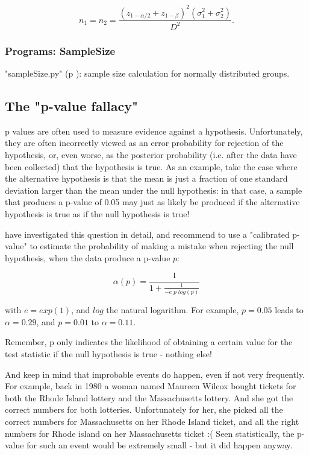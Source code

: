 \begin{equation}
  {n_1} = {n_2} = \frac{{({z_{1 - \alpha /2}} + {z_{1 - \beta }})}^2(\sigma _1^2 + \sigma _2^2)}{D^2} .
\end{equation}

\subsubsection{Programs: SampleSize}

\PyImg "sampleSize.py" (p \pageref{py:sampleSize}): sample size calculation for normally distributed groups.


\subsection{The "p-value fallacy"}

p values are often used to measure evidence against a hypothesis. Unfortunately, they are often incorrectly viewed as an error probability for rejection of the hypothesis, or, even worse, as the posterior probability (i.e. after the data have been collected) that the hypothesis is true. As an example, take the case where the alternative hypothesis is that the mean is just a fraction of one standard deviation larger than the mean under the null hypothesis: in that case, a sample that produces a p-value of 0.05 may just as likely be produced if the alternative hypothesis is true as if the null hypothesis is true!

\cite{sellke2001} have investigated this question in detail, and recommend to use a "calibrated p-value" to estimate the probability of making a mistake when rejecting the null hypothesis, when the data produce a p-value $p$:

\begin{equation}\label{eq:pFallacy}
    \alpha(p)= \frac{1}{1 + \frac{1}{-e \; p \; log(p)}}
\end{equation}

with $e=exp(1)$, and $log$ the natural logarithm. For example, $p=0.05$ leads to $\alpha=0.29$, and $p=0.01$ to $\alpha=0.11$.

Remember, p only indicates the likelihood of obtaining a certain value for the test statistic if the null hypothesis is true - nothing else!

And keep in mind that improbable events do happen, even if not very frequently. For example, back in 1980 a woman named Maureen Wilcox bought tickets for both the Rhode Island lottery and the Massachusetts lottery. And she got the correct numbers for both lotteries. Unfortunately for her, she picked all the correct numbers for Massachusetts on her Rhode Island ticket, and all the  right numbers for Rhode island on her Massachusetts ticket :(  Seen statistically, the p-value for such an event would be extremely small - but it did happen anyway.

